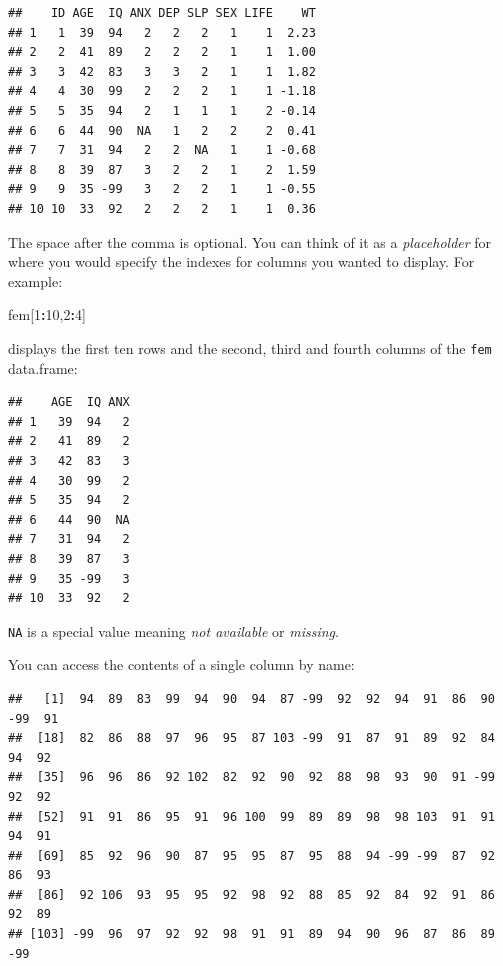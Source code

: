 \documentclass[12pt,]{book}
\newenvironment{Shaded}{\begin{snugshade}}{\end{snugshade}}
\newcommand{\DecValTok}[1]{\textcolor[rgb]{0.00,0.00,0.81}{#1}}
\newcommand{\OperatorTok}[1]{\textcolor[rgb]{0.81,0.36,0.00}{\textbf{#1}}}
\newcommand{\NormalTok}[1]{#1}
\theoremstyle{definition}
\theoremstyle{definition}
\theoremstyle{definition}
\theoremstyle{remark}
\begin{document}
\begin{verbatim}
##    ID AGE  IQ ANX DEP SLP SEX LIFE    WT
## 1   1  39  94   2   2   2   1    1  2.23
## 2   2  41  89   2   2   2   1    1  1.00
## 3   3  42  83   3   3   2   1    1  1.82
## 4   4  30  99   2   2   2   1    1 -1.18
## 5   5  35  94   2   1   1   1    2 -0.14
## 6   6  44  90  NA   1   2   2    2  0.41
## 7   7  31  94   2   2  NA   1    1 -0.68
## 8   8  39  87   3   2   2   1    2  1.59
## 9   9  35 -99   3   2   2   1    1 -0.55
## 10 10  33  92   2   2   2   1    1  0.36
\end{verbatim}

The space after the comma is optional. You can think of it as a
\emph{placeholder} for where you would specify the indexes for columns
you wanted to display. For example:

\begin{Shaded}
\begin{Highlighting}[]
\NormalTok{fem[}\DecValTok{1}\OperatorTok{:}\DecValTok{10}\NormalTok{,}\DecValTok{2}\OperatorTok{:}\DecValTok{4}\NormalTok{]}
\end{Highlighting}
\end{Shaded}

displays the first ten rows and the second, third and fourth columns of
the \texttt{fem} data.frame:

\begin{verbatim}
##    AGE  IQ ANX
## 1   39  94   2
## 2   41  89   2
## 3   42  83   3
## 4   30  99   2
## 5   35  94   2
## 6   44  90  NA
## 7   31  94   2
## 8   39  87   3
## 9   35 -99   3
## 10  33  92   2
\end{verbatim}

\texttt{NA} is a special value meaning \emph{not available} or
\emph{missing}.

You can access the contents of a single column by name:

\begin{Shaded}
\end{Shaded}

\begin{verbatim}
##   [1]  94  89  83  99  94  90  94  87 -99  92  92  94  91  86  90 -99  91
##  [18]  82  86  88  97  96  95  87 103 -99  91  87  91  89  92  84  94  92
##  [35]  96  96  86  92 102  82  92  90  92  88  98  93  90  91 -99  92  92
##  [52]  91  91  86  95  91  96 100  99  89  89  98  98 103  91  91  94  91
##  [69]  85  92  96  90  87  95  95  87  95  88  94 -99 -99  87  92  86  93
##  [86]  92 106  93  95  95  92  98  92  88  85  92  84  92  91  86  92  89
## [103] -99  96  97  92  92  98  91  91  89  94  90  96  87  86  89 -99
\end{verbatim}
\end{document}
